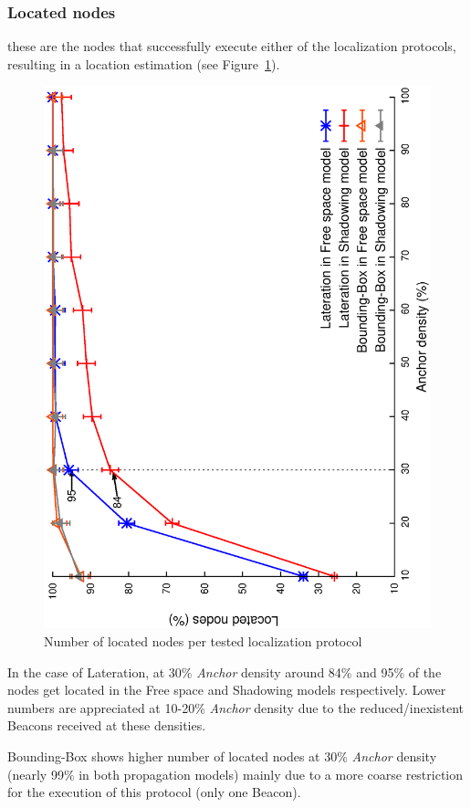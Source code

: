 
\subsubsection{Located nodes}
these are the nodes that successfully execute either of the localization protocols, resulting in a location estimation (see Figure~\ref{fig:locNodes}).

\begin{figure}[tb]
  \centering
  \includegraphics[width=0.7\linewidth, angle = -90]{section4/figures/locatedNodes.eps}
  \caption{Number of located nodes per tested localization protocol
  \label{fig:locNodes}}
\end{figure}

In the case of Lateration, at 30\% \emph{Anchor} density around 84\% and 95\% of the nodes get located in the Free space and Shadowing models respectively. Lower numbers are appreciated at 10-20\% \emph{Anchor} density due to the reduced/inexistent Beacons received at these densities.

Bounding-Box shows higher number of located nodes at 30\% \emph{Anchor} density (nearly 99\% in both propagation models) mainly due to a more coarse restriction for the execution of this protocol (only one Beacon).

